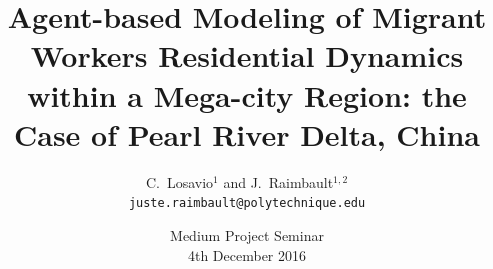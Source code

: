 \documentclass[english,11pt]{beamer}
\begin{document}
\title{Agent-based Modeling of Migrant Workers Residential Dynamics within a Mega-city Region: the Case of Pearl River Delta, China}

\author{C.~Losavio$^{1}$ and J.~Raimbault$^{1,2}$\\
\texttt{}
\texttt{juste.raimbault@polytechnique.edu}
}




\date{Medium Project Seminar\\\smallskip
4th December 2016
}


{




\frame{\maketitle}

}




\end{document}
